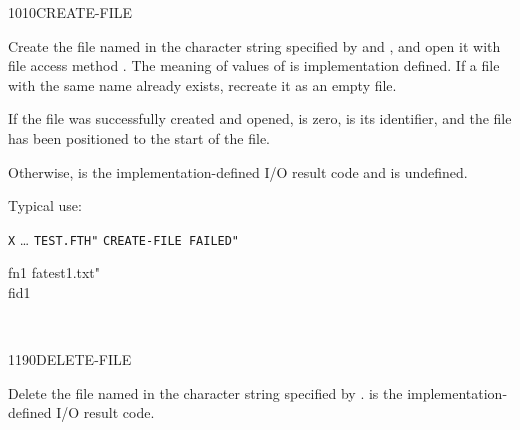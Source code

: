 \begin{worddef}{1010}{CREATE-FILE}
\item {}

	Create the file named in the character string specified by
	 and , and open it with file access method
	. The meaning of values of  is
	implementation defined. If a file with the same name already
	exists, recreate it as an empty file.

	If the file was successfully created and opened,  is
	zero,  is its identifier, and the file has been
	positioned to the start of the file.

	Otherwise,  is the implementation-defined I/O result
	code and  is undefined.

	\begin{rationale} %
		Typical use:

		\tab \word[core]{:} \texttt{X} {\ldots}
				 \texttt{TEST.FTH"} 
				 \texttt{CREATE-FILE FAILED"}
			\word[core]{;}
	\end{rationale}

	\begin{testing} %
		\ttfamily
		\word{:} fn1  fatest1.txt" \word{;} \\
		 fid1

		 \\
	\end{testing}
\end{worddef}


\begin{worddef}{1190}{DELETE-FILE}
\item {}

	Delete the file named in the character string specified by
	.  is the {im\-ple\-ment\-ation-de\-fin\-ed}
	I/O result code.

	\begin{testing} %
		 \\
		 \\
	\end{testing}
\end{worddef}


